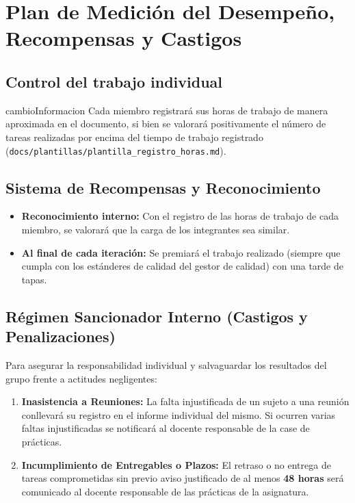 \newpage
\section{Plan de Medición del Desempeño, Recompensas y Castigos}

\subsection{Control del trabajo individual}
\begin{cambiocontenido}{cambioInformacion}
Cada miembro registrará sus horas de trabajo de manera aproximada en el documento, si bien se valorará positivamente el número de tareas realizadas por encima del tiempo de trabajo registrado (\texttt{docs/plantillas/plantilla\_registro\_horas.md}).

\end{cambiocontenido}

\subsection{Sistema de Recompensas y Reconocimiento}
\begin{itemize}[leftmargin=*]
  \item \textbf{Reconocimiento interno:} Con el registro de las horas de trabajo de cada miembro, se valorará que la carga de los integrantes sea similar.
  \item \textbf{Al final de cada iteración:} Se premiará el trabajo realizado (siempre que cumpla con los estánderes de calidad del gestor de calidad) con una tarde de tapas.
\end{itemize}

\subsection{Régimen Sancionador Interno (Castigos y Penalizaciones)}
Para asegurar la responsabilidad individual y salvaguardar los resultados del grupo frente a actitudes negligentes:
\begin{enumerate}[leftmargin=*]
  \item \textbf{Inasistencia a Reuniones:} La falta injustificada de un sujeto a una reunión conllevará su registro en el informe individual del mismo. Si ocurren varias faltas injustificadas se notificará al docente responsable de la case de prácticas.
  \item \textbf{Incumplimiento de Entregables o Plazos:} El retraso o no entrega de tareas comprometidas sin previo aviso justificado de al menos \textbf{48 horas} será comunicado al docente responsable de las prácticas de la asignatura.
\end{enumerate}

